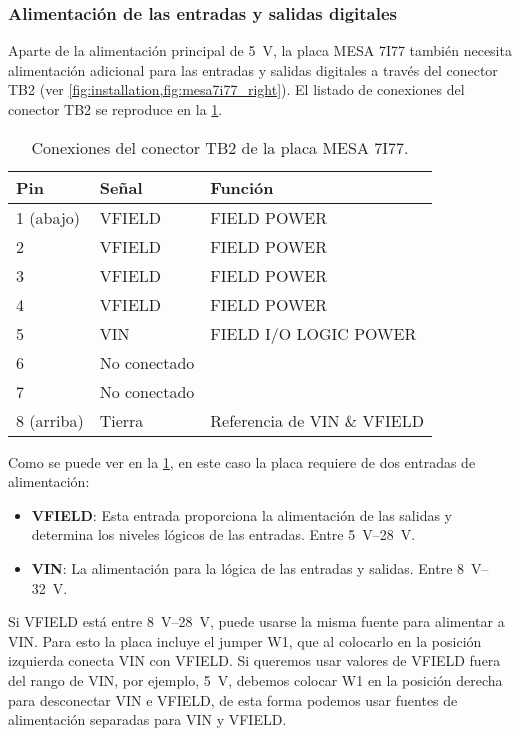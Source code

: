 \documentclass[english,spanish,a4paper,11pt]{article}
\begin{document}
\subsubsection{Alimentación de las entradas y salidas digitales}

Aparte de la alimentación principal de \qty{5}{\V}, la placa MESA 7I77 también necesita alimentación adicional para las entradas y salidas digitales a través del conector TB2 (ver \cref{fig:installation,fig:mesa7i77_right}). El listado de conexiones del conector TB2 se reproduce en la \cref{tab:mesa7i77_tb2}.

\begin{table}[!ht]
    \centering
    \begin{tabular}{lll}
        \toprule
        Pin & Señal & Función \\
        \midrule
        1 (abajo)  & VFIELD & FIELD POWER \\
        2          & VFIELD & FIELD POWER \\
        3          & VFIELD & FIELD POWER \\
        4          & VFIELD & FIELD POWER \\
        5          & VIN    & FIELD I/O LOGIC POWER \\
        6          & No conectado \\
        7          & No conectado \\
        8 (arriba) & Tierra & Referencia de VIN \& VFIELD \\
        \bottomrule
    \end{tabular}
    \caption{Conexiones del conector TB2 de la placa MESA 7I77.}
    \label{tab:mesa7i77_tb2}
\end{table}

Como se puede ver en la \cref{tab:mesa7i77_tb2}, en este caso la placa requiere de dos entradas de alimentación:
\begin{itemize}
    \item \textbf{VFIELD}: Esta entrada proporciona la alimentación de las salidas y determina los niveles lógicos de las entradas. Entre \qtyrange[range-phrase={ y }]{5}{28}{\V}.
    \item \textbf{VIN}: La alimentación para la lógica de las entradas y salidas. Entre \qtyrange[range-phrase={ y }]{8}{32}{\V}.
\end{itemize}

Si VFIELD está entre \qtyrange[range-phrase={ y }]{8}{28}{\V}, puede usarse la misma fuente para alimentar a VIN. Para esto la placa incluye el jumper W1, que al colocarlo en la posición izquierda conecta VIN con VFIELD. Si queremos usar valores de VFIELD fuera del rango de VIN, por ejemplo, \qty{5}{\V}, debemos colocar W1 en la posición derecha para desconectar VIN e VFIELD, de esta forma podemos usar fuentes de alimentación separadas para VIN y VFIELD.
\end{document}
